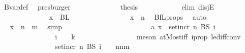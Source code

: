 \begin{isabellebody}
\ Bvar{\isacharunderscore}{\kern0pt}def\ \isamarkupfalse%
\ presburger\isanewline
\ \ \ \ \ \ \ \ \ \ \isamarkupfalse%
\ \isamarkupfalse%
\ {\isacharquery}{\kern0pt}thesis\isanewline
\ \ \ \ \ \ \ \ \ \ \isamarkupfalse%
\ {\isacharparenleft}{\kern0pt}elim\ disjE{\isacharparenright}{\kern0pt}\isanewline
\ \ \ \ \ \ \ \ \ \ \ \ \isamarkupfalse%
\ {\isachardoublequoteopen}x\ {\isasymin}\ BL\ {}{\isachardoublequoteclose}\isanewline
\ \ \ \ \ \ \ \ \ \ \ \ \isamarkupfalse%
\ \isamarkupfalse%
\ {\isachardoublequoteopen}x\ {\isasymin}\ {\isacharbraceleft}{\kern0pt}{\isachardot}{\kern0pt}{\isachardot}{\kern0pt}{\isacharless}{\kern0pt}n{\isacharbraceright}{\kern0pt}{\isachardoublequoteclose}\ \isamarkupfalse%
\ BfL{\isacharunderscore}{\kern0pt}props\ \isamarkupfalse%
\ auto\isanewline
\ \ \ \ \ \ \ \ \ \ \ \ \isamarkupfalse%
\ \isamarkupfalse%
\ {\isachardoublequoteopen}x\ {\isasymin}\ {\isacharbraceleft}{\kern0pt}{\isachardot}{\kern0pt}{\isachardot}{\kern0pt}{\isacharless}{\kern0pt}n\ {\isacharplus}{\kern0pt}\ m{\isacharbraceright}{\kern0pt}{\isachardoublequoteclose}\ \isamarkupfalse%
\ simp\isanewline
\ \ \ \ \ \ \ \ \ \ \isamarkupfalse%
\isanewline
\ \ \ \ \ \ \ \ \ \ \ \ \isamarkupfalse%
\ a{\isacharcolon}{\kern0pt}\ {\isachardoublequoteopen}x\ {\isasymin}\ set{\isacharunderscore}{\kern0pt}incr\ n\ {\isacharparenleft}{\kern0pt}BS\ {\isacharparenleft}{\kern0pt}i\ {\isacharminus}{\kern0pt}\ {}{\isacharparenright}{\kern0pt}{\isacharparenright}{\kern0pt}{\isachardoublequoteclose}\isanewline
\ \ \ \ \ \ \ \ \ \ \ \ \isamarkupfalse%
\ \isamarkupfalse%
\ {\isachardoublequoteopen}i\ {\isacharminus}{\kern0pt}\ {}\ {\isasymle}\ k{\isachardoublequoteclose}\ \isanewline
\ \ \ \ \ \ \ \ \ \ \ \ \ \ \isamarkupfalse%
\ {\isacharparenleft}{\kern0pt}meson\ atMost{\isacharunderscore}{\kern0pt}iff\ i{\isacharunderscore}{\kern0pt}prop\ le{\isacharunderscore}{\kern0pt}diff{\isacharunderscore}{\kern0pt}conv{\isacharparenright}{\kern0pt}\ \isanewline
\ \ \ \ \ \ \ \ \ \ \ \ \isamarkupfalse%
\ \isamarkupfalse%
\ {\isachardoublequoteopen}set{\isacharunderscore}{\kern0pt}incr\ n\ {\isacharparenleft}{\kern0pt}BS\ {\isacharparenleft}{\kern0pt}i\ {\isacharminus}{\kern0pt}\ {}{\isacharparenright}{\kern0pt}{\isacharparenright}{\kern0pt}\ {\isasymsubseteq}\ {\isacharbraceleft}{\kern0pt}n{\isachardot}{\kern0pt}{\isachardot}{\kern0pt}{\isacharless}{\kern0pt}n{\isacharplus}{\kern0pt}m{\isacharbraceright}{\kern0pt}{\isachardoublequoteclose}\ \isamarkupfalse%

\end{isabellebody}

